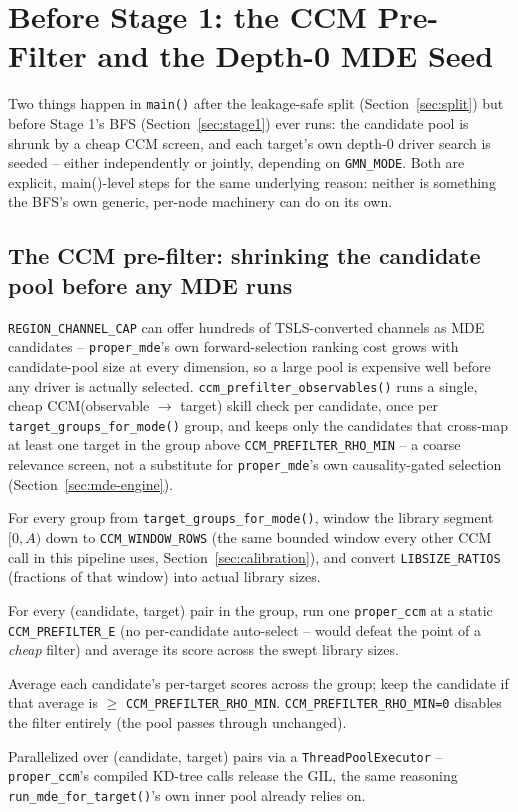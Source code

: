 \documentclass[11pt]{article}
\begin{document}
\newpage
\section{Before Stage 1: the CCM Pre-Filter and the Depth-0 MDE Seed}
\label{sec:gmn-mode-joint}
Two things happen in \texttt{main()} after the leakage-safe split (Section~\ref{sec:split}) but before Stage 1's BFS (Section~\ref{sec:stage1}) ever runs: the candidate pool is shrunk by a cheap CCM screen, and each target's own depth-0 driver search is seeded -- either independently or jointly, depending on \texttt{GMN\_MODE}. Both are explicit, main()-level steps for the same underlying reason: neither is something the BFS's own generic, per-node machinery can do on its own.

\subsection{The CCM pre-filter: shrinking the candidate pool before any MDE runs}
\label{sec:ccm-prefilter}
\texttt{REGION\_CHANNEL\_CAP} can offer hundreds of TSLS-converted channels as MDE candidates -- \texttt{proper\_mde}'s own forward-selection ranking cost grows with candidate-pool size at every dimension, so a large pool is expensive well before any driver is actually selected. \texttt{ccm\_prefilter\_observables()} runs a single, cheap CCM(observable $\to$ target) skill check per candidate, once per \texttt{target\_groups\_for\_mode()} group, and keeps only the candidates that cross-map at least one target in the group above \texttt{CCM\_PREFILTER\_RHO\_MIN} -- a coarse relevance screen, not a substitute for \texttt{proper\_mde}'s own causality-gated selection (Section~\ref{sec:mde-engine}).

\begin{steps}
\item For every group from \texttt{target\_groups\_for\_mode()}, window the library segment $[0,A)$ down to \texttt{CCM\_WINDOW\_ROWS} (the same bounded window every other CCM call in this pipeline uses, Section~\ref{sec:calibration}), and convert \texttt{LIBSIZE\_RATIOS} (fractions of that window) into actual library sizes.
\item For every (candidate, target) pair in the group, run one \texttt{proper\_ccm} at a static \texttt{CCM\_PREFILTER\_E} (no per-candidate auto-select -- would defeat the point of a \emph{cheap} filter) and average its score across the swept library sizes.
\item Average each candidate's per-target scores across the group; keep the candidate if that average is $\geq$ \texttt{CCM\_PREFILTER\_RHO\_MIN}. \texttt{CCM\_PREFILTER\_RHO\_MIN=0} disables the filter entirely (the pool passes through unchanged).
\item Parallelized over (candidate, target) pairs via a \texttt{ThreadPoolExecutor} -- \texttt{proper\_ccm}'s compiled KD-tree calls release the GIL, the same reasoning \texttt{run\_mde\_for\_target()}'s own inner pool already relies on.
\end{steps}
\end{document}
